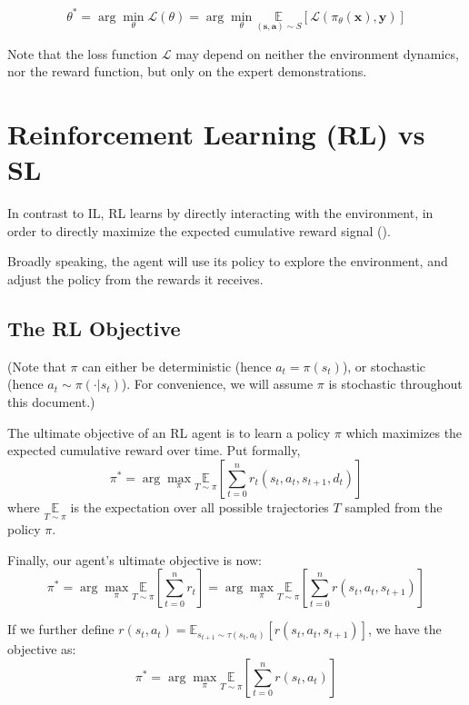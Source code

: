 \documentclass{article} %
\begin{document}
\begin{equation} \label {il_obj}
    \theta^* = \arg\min_\theta \mathcal{L}(\theta) = \arg\min_\theta \underset{(\mathbf{s}, \mathbf{a}) \sim S}{\mathbb{E}}[\mathcal{L}(\pi_\theta(\mathbf{x}), \mathbf{y})]
\end{equation}

Note that the loss function $\mathcal{L}$ may depend on neither the environment dynamics,
nor the reward function, but only on the expert demonstrations.

\section{Reinforcement Learning (RL) vs SL}

In contrast to IL, RL learns by directly interacting with the environment,
in order to directly maximize the expected cumulative reward signal (\cite{Sutton-and-Barto-1998}).

Broadly speaking, the agent will use its policy to explore the environment,
and adjust the policy from the rewards it receives.

\subsection{The RL Objective} \label{rl_obj}

(Note that $\pi$ can either be deterministic (hence $a_t = \pi(s_t)$), or stochastic (hence $a_t \sim \pi(\cdot | s_t)$).
For convenience, we will assume $\pi$ is stochastic throughout this document.)

The ultimate objective of an RL agent is to learn a policy $\pi$ which maximizes the expected cumulative reward over time. Put formally,
\begin{equation} \label{sdmp_obj}
      \pi^* = \arg\max_\pi \underset{T \sim \pi}{\mathbb{E}} \left[ \sum_{t=0}^{n} r_t(s_t, a_t, s_{t+1}, d_t) \right]
\end{equation}
where $\underset{T \sim \pi}{\mathbb{E}}$ is the expectation over all possible trajectories $T$ sampled from the policy $\pi$.

Finally, our agent's ultimate objective is now:
\begin{equation} \label{mdp_obj}
    \pi^* = \arg\max_\pi \underset{T \sim \pi}{\mathbb{E}} \left[ \sum_{t=0}^{n} r_t \right] = \arg\max_\pi \underset{T \sim \pi}{\mathbb{E}} \left[ \sum_{t=0}^{n} r(s_t, a_t, s_{t + 1}) \right]
\end{equation}

If we further define $r(s_t, a_t) = \mathbb{E}_{s_{t + 1} \sim \tau(s_t, a_t)}[r(s_t, a_t, s_{t + 1})]$, 
we have the objective as:
\begin{equation} \label{mdp_obj_concise}
   \pi^* = \arg\max_\pi \underset{T \sim \pi}{\mathbb{E}} \left[ \sum_{t=0}^{n} r(s_t, a_t) \right]
\end{equation}




\end{document}
